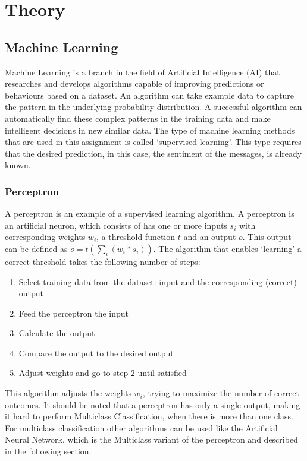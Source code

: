 \documentclass[11pt]{article}
\begin{document}
\section{Theory}
\subsection{Machine Learning}
Machine Learning is a branch in the field of Artificial Intelligence (AI) that researches and develops algorithms capable of improving predictions or behaviours based on a dataset. An algorithm can take example data to capture the pattern in the underlying probability distribution. A successful algorithm can automatically find these complex patterns in the training data and make intelligent decisions in new similar data. The type of machine learning methods that are used in this assignment is called `supervised learning'. This type requires that the desired prediction, in this case, the sentiment of the messages, is already known.
\subsubsection{Perceptron}
A perceptron is an example of a supervised learning algorithm. A perceptron is an artificial neuron, which consists of has one or more inputs $s_i$ with corresponding weights $w_i$, a threshold function $t$ and an output $o$. This output can be defined as $o = t(\sum_i(w_i * s_i))$. The algorithm that enables `learning' a correct threshold takes the following number of steps:
\begin{enumerate}
\item Select training data from the dataset: input and the corresponding (correct) output
\item Feed the perceptron the input
\item Calculate the output
\item Compare the output to the desired output
\item Adjust weights and go to step 2 until satisfied
\end{enumerate}
This algorithm adjusts the weights $w_i$, trying to maximize the number of correct outcomes. It should be noted that a perceptron has only a single output, making it hard to perform Multiclass Classification, when there is more than one class. For multiclass classification other algorithms can be used like the Artificial Neural Network, which is the Multiclass variant of the perceptron and described in the following section.
\end{document}
